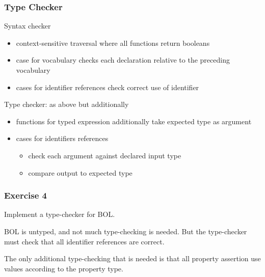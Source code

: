 \begin{frame}\frametitle{Type Checker}
Syntax checker
\begin{itemize}
 \item context-sensitive traversal where all functions return booleans
 \item case for vocabulary checks each declaration relative to the preceding vocabulary
 \item cases for identifier references check correct use of identifier
\end{itemize}

Type checker: as above but additionally
\begin{itemize}
 \item functions for typed expression additionally take expected type as argument
 \item cases for identifiers references
   \begin{itemize}
   \item check each argument against declared input type
   \item compare output to expected type
   \end{itemize}
\end{itemize}
\end{frame}

\begin{frame}\frametitle{Exercise 4}
Implement a type-checker for BOL.

BOL is untyped, and not much type-checking is needed.
But the type-checker must check that all identifier references are correct.

The only additional type-checking that is needed is that all property assertion use values according to the property type.
\end{frame}

%

